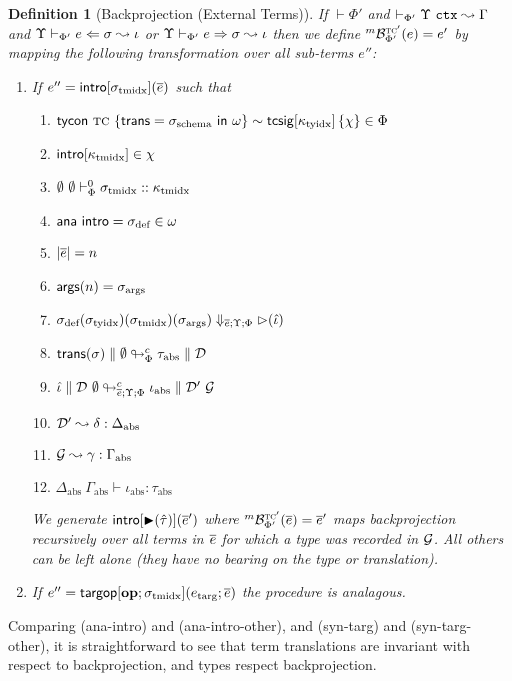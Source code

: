 \documentclass[12pt]{article}
\newtheorem{definition}{Definition}
\begin{document}
\begin{definition}[Backprojection (External Terms)]
If $\vdash \Phi'$ and $\vdash_{\Phi'} \Upsilon~\mathtt{ctx} \leadsto \Gamma$ and $\Upsilon \vdash_{\Phi'} e \Leftarrow \sigma \leadsto \iota$ or $\Upsilon \vdash_{\Phi'} e \Rightarrow \sigma \leadsto \iota$ then we define ${}^{m}\mathcal{B}_{\Phi'}^{\textsc{tc}'}(e)=e'$ by mapping the following transformation over all sub-terms $e''$: \begin{enumerate}
\item If $e''={\sf intro}[\sigma_\text{tmidx}](\overline{e})$ such that \begin{enumerate}[(1)]
  \item ${\sf tycon}~\textsc{tc} ~\{{\sf trans}=\sigma_\text{schema}~{\sf in}~\omega\} \sim {\sf tcsig}[\kappa_\text{tyidx}]\,\{\chi\} \in \Phi$
  \item ${\sf intro}[\kappa_\text{tmidx}] \in \chi$
  \item $\emptyset~\emptyset \vdash_{\Phi}^{0} \sigma_\text{tmidx} :: \kappa_\text{tmidx}$
  \item ${\sf ana~intro}={\sigma_\text{def}} \in \omega$
  \item $|\overline{e}| = n$
  \item ${\sf args}(n)=\sigma_\text{args}$
  \item $\sigma_\text{def}(\sigma_\text{tyidx})(\sigma_\text{tmidx})(\sigma_\text{args}) \Downarrow_{\overline{e};\Upsilon;\Phi} {\rhd}(\hat{\iota})$
  \item ${\sf trans}(\sigma) \parallel \emptyset \looparrowright_{\Phi}^{c} \tau_\text{abs} \parallel \mathcal{D}$
  \item $\hat{\iota} \parallel \mathcal{D}~\emptyset \looparrowright^{c}_{{\overline{e};\Upsilon;\Phi}} \iota_\text{abs} \parallel \mathcal{D}'~\mathcal{G}$
  \item $\mathcal{D}' \leadsto \delta : \Delta_\text{abs}$
  \item $\mathcal{G} \leadsto \gamma : \Gamma_\text{abs}$
  \item $\Delta_\text{abs}~\Gamma_\text{abs} \vdash \iota_\text{abs} : \tau_\text{abs}$
\end{enumerate}

We generate ${\sf intro}[{\blacktriangleright}(\hat{\tau})](\overline{e}')$ where ${}^{m}\mathcal{B}_{\Phi'}^{\textsc{tc}'}(\overline{e})=\overline{e}'$ maps backprojection recursively over all terms in $\overline{e}$ for which a type was recorded in $\mathcal{G}$. All others can be left alone (they have no bearing on the type or translation).

\item If $e''={\sf targop}[\textbf{op}; \sigma_\text{tmidx}](e_\text{targ}; \overline{e})$ the procedure is analagous.
\end{enumerate}
\end{definition}

Comparing (ana-intro) and (ana-intro-other), and (syn-targ) and (syn-targ-other), it is straightforward to see that term translations are invariant with respect to backprojection, and types respect backprojection.
\end{document}

